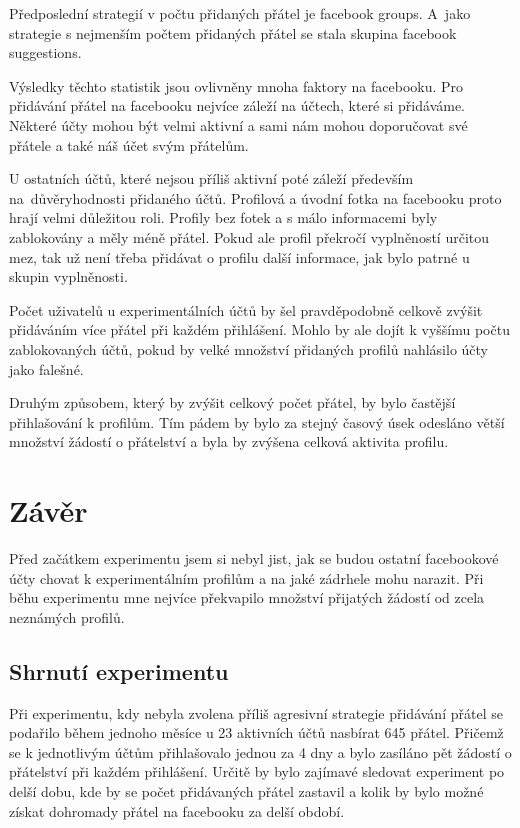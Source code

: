 \documentclass[thesis=M,czech]{FITthesis}[2013/05/10]
\begin{document}
Předposlední strategií v počtu přidaných přátel je facebook groups. A~jako strategie s nejmenším počtem přidaných přátel se stala skupina facebook suggestions. 

Výsledky těchto statistik jsou ovlivněny mnoha faktory na facebooku. Pro přidávání přátel na facebooku nejvíce záleží na účtech, které si přidáváme. Některé účty mohou být velmi aktivní a sami nám mohou doporučovat své přátele a také náš účet svým přátelům. 

U ostatních účtů, které nejsou příliš aktivní poté záleží především na~důvěryhodnosti přidaného účtů. Profilová a úvodní fotka na facebooku proto hrají velmi důležitou roli. Profily bez fotek a s málo informacemi byly zablokovány a měly méně přátel. Pokud ale profil překročí vyplněností určitou mez, tak už není třeba přidávat o profilu další informace, jak bylo patrné u skupin vyplněnosti.

Počet uživatelů u experimentálních účtů by šel pravděpodobně celkově zvýšit přidáváním více přátel při každém přihlášení. Mohlo by ale dojít k vyššímu počtu zablokovaných účtů, pokud by velké množství přidaných profilů nahlásilo účty jako falešné.

Druhým způsobem, který by zvýšit celkový počet přátel, by bylo častější přihlašování k profilům. Tím pádem by bylo za stejný časový úsek odesláno větší množství žádostí o přátelství a byla by zvýšena celková aktivita profilu.


\chapter{Z{\' a}v{\v e}r}

Před začátkem experimentu jsem si nebyl jist, jak se budou ostatní facebookové účty chovat k experimentálním profilům a na jaké zádrhele mohu narazit. Při běhu experimentu mne nejvíce překvapilo množství přijatých žádostí od zcela neznámých profilů.

\section{Shrnutí experimentu}

Při experimentu, kdy nebyla zvolena příliš agresivní strategie přidávání přátel se podařilo během jednoho měsíce u 23 aktivních účtů nasbírat 645 přátel. Přičemž se k jednotlivým účtům přihlašovalo jednou za 4 dny a bylo zasíláno pět žádostí o přátelství při každém přihlášení. Určitě by bylo zajímavé sledovat experiment po delší dobu, kde by se počet přidávaných přátel zastavil a kolik by bylo možné získat dohromady přátel na facebooku za delší období.
\end{document}
